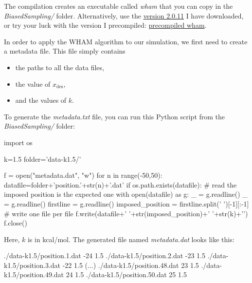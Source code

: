 \noindent The compilation creates an executable called \textit{wham} that you can 
copy in the \textit{BiasedSampling/} folder. Alternatively, use 
the \href{https://lammpstutorials.github.io/lammpstutorials-inputs/level3/free-energy-calculation/BiasedSampling/wham-release-2.0.11.tgz}{version 2.0.11} I have downloaded, or try your luck with the version 
I precompiled: \href{https://lammpstutorials.github.io/lammpstutorials-inputs/level3/free-energy-calculation/BiasedSampling/wham}{precompiled wham}.

\vspace{0.25cm} \noindent In order to apply the WHAM algorithm to our simulation, we
first need to create a metadata file. This file simply
contains 

\begin{itemize}
\item the paths to all the data files,
\item the value of $x_\text{des}$,
\item and the values of $k$.
\end{itemize}

\vspace{0.25cm} \noindent To generate the \textit{metadata.txt} file, you can run this Python script
from the \textit{BiasedSampling/} folder:

\begin{lcverbatim}
import os

k=1.5 
folder='data-k1.5/'

f = open("metadata.dat", "w")
for n in range(-50,50):
    datafile=folder+'position.'+str(n)+'.dat'
    if os.path.exists(datafile):
        # read the imposed position is the expected one
        with open(datafile) as g:
            _ = g.readline()
            _ = g.readline()
            firstline = g.readline()
        imposed_position = firstline.split(' ')[-1][:-1]
        # write one file per file
        f.write(datafile+' '+str(imposed_position)+' '+str(k)+'\n')
f.close()
\end{lcverbatim}

\noindent Here, $k$ is in kcal/mol.
The generated file named \textit{metadata.dat} looks like this:

\begin{lcverbatim}
./data-k1.5/position.1.dat -24 1.5
./data-k1.5/position.2.dat -23 1.5
./data-k1.5/position.3.dat -22 1.5
(...)
./data-k1.5/position.48.dat 23 1.5
./data-k1.5/position.49.dat 24 1.5
./data-k1.5/position.50.dat 25 1.5
\end{lcverbatim}

